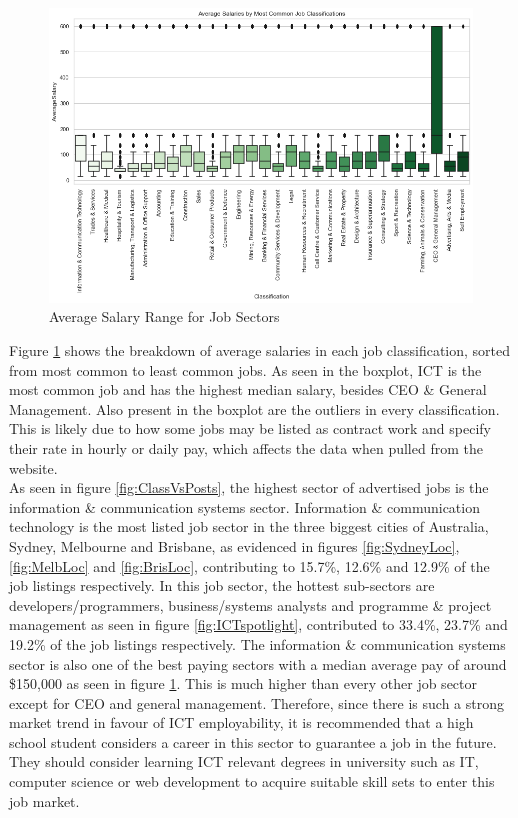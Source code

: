\documentclass[twoside, 12pt, a4paper]{article}
\begin{document}
\newpage
\begin{figure}[h]
	\centering
	\includegraphics[scale = 0.50]{SectorAvgSalBox.png}
	\caption{Average Salary Range for Job Sectors}
	\label{fig:AvgSalBox}
\end{figure}

Figure \ref{fig:AvgSalBox} shows the breakdown of average salaries in each job classification, sorted from most common to least common jobs. As seen in the boxplot, ICT is the most common job and has the highest median salary, besides CEO \& General Management. Also present in the boxplot are the outliers in every classification. This is likely due to how some jobs may be listed as contract work and specify their rate in hourly or daily pay, which affects the data when pulled from the website.\\

As seen in figure \ref{fig:ClassVsPosts}, the highest sector of advertised jobs is the information \& communication systems sector. Information \& communication technology is the most listed job sector in the three biggest cities of Australia, Sydney, Melbourne and Brisbane, as evidenced in figures \ref{fig:SydneyLoc}, \ref{fig:MelbLoc} and \ref{fig:BrisLoc}, contributing to 15.7\%, 12.6\% and 12.9\% of the job listings respectively. In this job sector, the hottest sub-sectors are developers/programmers, business/systems analysts and programme \& project management as seen in figure \ref{fig:ICTspotlight}, contributed to 33.4\%, 23.7\% and 19.2\% of the job listings respectively. The information \& communication systems sector is also one of the best paying sectors with a median average pay of around \$150,000 as seen in figure \ref{fig:AvgSalBox}. This is much higher than every other job sector except for CEO and general management. Therefore, since there is such a strong market trend in favour of ICT employability, it is recommended that a high school student considers a career in this sector to guarantee a job in the future. They should consider learning ICT relevant degrees in university such as IT, computer science or web development to acquire suitable skill sets to enter this job market. 
\end{document}

